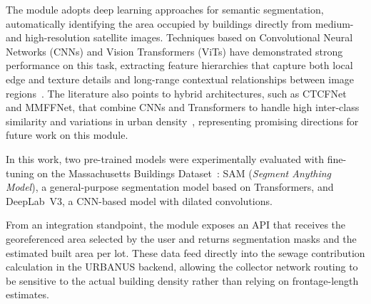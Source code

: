 The module adopts deep learning approaches for semantic segmentation, automatically identifying the area occupied by buildings directly from medium- and high-resolution satellite images.
Techniques based on Convolutional Neural Networks (CNNs) and Vision Transformers (ViTs) have demonstrated strong performance on this task, extracting feature hierarchies that capture both local edge and texture details and long-range contextual relationships between image regions~\cite{alidoost2018cnn,dosovitskiy2021imageworth16x16words}.
The literature also points to hybrid architectures, such as CTCFNet and MMFFNet, that combine CNNs and Transformers to handle high inter-class similarity and variations in urban density~\cite{zhang2024building,zhou2024hierarchical}, representing promising directions for future work on this module.

In this work, two pre-trained models were experimentally evaluated with fine-tuning on the Massachusetts Buildings Dataset~\cite{MassachusettsBuildingsDataset}: SAM (\textit{Segment Anything Model}), a general-purpose segmentation model based on Transformers, and DeepLab~V3, a CNN-based model with dilated convolutions.

From an integration standpoint, the module exposes an API that receives the georeferenced area selected by the user and returns segmentation masks and the estimated built area per lot.
These data feed directly into the sewage contribution calculation in the URBANUS backend, allowing the collector network routing to be sensitive to the actual building density rather than relying on frontage-length estimates.





